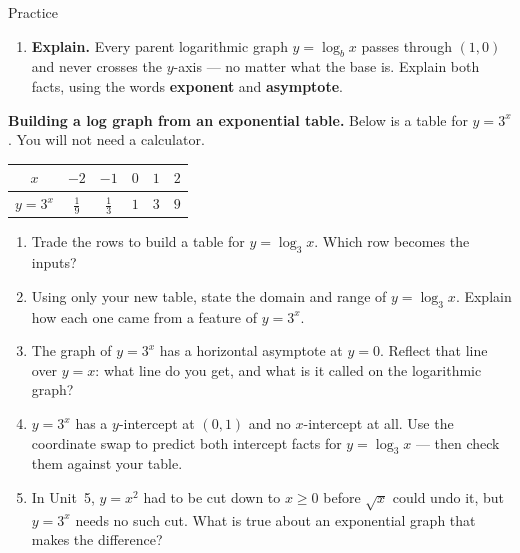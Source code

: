 \documentclass[10pt]{article}
\begin{document}
\begin{notesbox}{Practice}
\begin{enumerate}[leftmargin=1.9em, itemsep=12pt]
  \item \textbf{Explain.} Every parent logarithmic graph $y=\log_b x$ passes through $(1,0)$ and
        never crosses the $y$-axis --- no matter what the base is. Explain both facts, using the
        words \textbf{exponent} and \textbf{asymptote}.
\end{enumerate}
\end{notesbox}

\begin{extensionbox}
\textbf{Building a log graph from an exponential table.} Below is a table for $y=3^x$. You will not
need a calculator.
\begin{center}
\renewcommand{\arraystretch}{1.25}
\begin{tabular}{|c|c|c|c|c|c|}
\hline
$x$ & $-2$ & $-1$ & $0$ & $1$ & $2$ \\ \hline
$y=3^x$ & $\tfrac19$ & $\tfrac13$ & $1$ & $3$ & $9$ \\ \hline
\end{tabular}
\end{center}
\begin{enumerate}[label=(\alph*), leftmargin=1.8em, itemsep=5pt]
  \item Trade the rows to build a table for $y=\log_3 x$. Which row becomes the inputs?
  \item Using only your new table, state the domain and range of $y=\log_3 x$. Explain how each one
        came from a feature of $y=3^x$.
  \item The graph of $y=3^x$ has a horizontal asymptote at $y=0$. Reflect that line over $y=x$: what
        line do you get, and what is it called on the logarithmic graph?
  \item $y=3^x$ has a $y$-intercept at $(0,1)$ and no $x$-intercept at all. Use the coordinate swap
        to predict both intercept facts for $y=\log_3 x$ --- then check them against your table.
  \item In Unit~5, $y=x^2$ had to be cut down to $x\ge 0$ before $\sqrt{x}$ could undo it, but
        $y=3^x$ needs no such cut. What is true about an exponential graph that makes the difference?
\end{enumerate}
\end{extensionbox}
\end{document}
